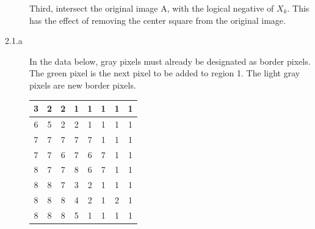 \documentclass[fleqn]{article}
\begin{document}
\begin{description}
    Third, intersect the original image A, with the logical negative of \begin{math}X_k\end{math}. This has the effect of removing the center square from the original image.

\item [2.1.a]
    In the data below, gray pixels must already be designated as border pixels. The green pixel is the next pixel to be added to region 1. The light gray pixels are new border pixels.

    \begin{tabular}{| c | c | c | c | c | c | c | c |}
        \hline
        3 & 2 & 2 & \cellcolor{orange} 1 & \cellcolor{orange} 1 & \cellcolor{orange} 1 & \cellcolor{orange} 1 & \cellcolor{orange} 1 \\ \hline
        \cellcolor{orange} 6 & 5 & \cellcolor{gray} 2 & \cellcolor{gray} 2 & \cellcolor{orange} 1 & \cellcolor{orange} 1 & \cellcolor{orange} 1 & \cellcolor{orange} 1 \\ \hline
        \cellcolor{orange} 7 & \cellcolor{orange} 7 & \cellcolor{orange} 7 & \cellcolor{gray} 7 & \cellcolor{lightgray} 7 & \cellcolor{orange} 1 & \cellcolor{orange} 1 & \cellcolor{orange} 1 \\ \hline
        \cellcolor{orange} 7 & \cellcolor{orange} 7 & \cellcolor{orange} 6 & \cellcolor{green} 7 & \cellcolor{lightgray} 6 & 7 & \cellcolor{orange} 1 & \cellcolor{orange} 1 \\ \hline
        \cellcolor{orange} 8 & \cellcolor{orange} 7 & \cellcolor{orange} 7 & \cellcolor{gray} 8 & \cellcolor{lightgray} 6 & 7 & \cellcolor{orange} 1 & \cellcolor{orange} 1 \\ \hline
        \cellcolor{orange} 8 & \cellcolor{orange} 8 & \cellcolor{orange} 7 & \cellcolor{gray} 3 & \cellcolor{orange} 2 & \cellcolor{orange} 1 & \cellcolor{orange} 1 & \cellcolor{orange} 1 \\ \hline
        \cellcolor{orange} 8 & \cellcolor{orange} 8 & \cellcolor{orange} 8 & \cellcolor{gray} 4 & \cellcolor{orange} 2 & \cellcolor{orange} 1 & \cellcolor{orange} 2 & \cellcolor{orange} 1 \\ \hline
        \cellcolor{orange} 8 & \cellcolor{orange} 8 & \cellcolor{orange} 8 & \cellcolor{gray} 5 & \cellcolor{orange} 1 & \cellcolor{orange} 1 & \cellcolor{orange} 1 & \cellcolor{orange} 1 \\ \hline
    \end{tabular}


\end{description}
\end{document}
